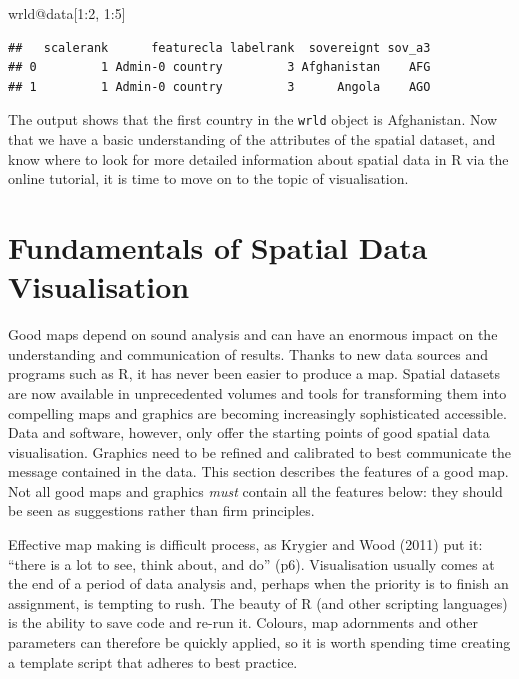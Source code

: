 \documentclass[]{article}
\newenvironment{Shaded}{}{}
\newcommand{\DecValTok}[1]{\textcolor[rgb]{0.25,0.63,0.44}{{#1}}}
\newcommand{\NormalTok}[1]{{#1}}
\begin{document}
\begin{Shaded}
\begin{Highlighting}[]
\NormalTok{wrld@data[}\DecValTok{1}\NormalTok{:}\DecValTok{2}\NormalTok{, }\DecValTok{1}\NormalTok{:}\DecValTok{5}\NormalTok{]}
\end{Highlighting}
\end{Shaded}

\begin{verbatim}
##   scalerank      featurecla labelrank  sovereignt sov_a3
## 0         1 Admin-0 country         3 Afghanistan    AFG
## 1         1 Admin-0 country         3      Angola    AGO
\end{verbatim}

The output shows that the first country in the \texttt{wrld} object is
Afghanistan. Now that we have a basic understanding of the attributes of
the spatial dataset, and know where to look for more detailed
information about spatial data in R via the online tutorial, it is time
to move on to the topic of visualisation.

\section{Fundamentals of Spatial Data Visualisation}

Good maps depend on sound analysis and can have an enormous impact on
the understanding and communication of results. Thanks to new data
sources and programs such as R, it has never been easier to produce a
map. Spatial datasets are now available in unprecedented volumes and
tools for transforming them into compelling maps and graphics are
becoming increasingly sophisticated accessible. Data and software,
however, only offer the starting points of good spatial data
visualisation. Graphics need to be refined and calibrated to best
communicate the message contained in the data. This section describes
the features of a good map. Not all good maps and graphics \emph{must}
contain all the features below: they should be seen as suggestions
rather than firm principles.

Effective map making is difficult process, as Krygier and Wood (2011)
put it: ``there is a lot to see, think about, and do'' (p6).
Visualisation usually comes at the end of a period of data analysis and,
perhaps when the priority is to finish an assignment, is tempting to
rush. The beauty of R (and other scripting languages) is the ability to
save code and re-run it. Colours, map adornments and other parameters
can therefore be quickly applied, so it is worth spending time creating
a template script that adheres to best practice.
\end{document}
